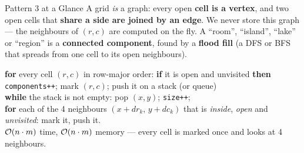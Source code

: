 \begin{patternbox}{Pattern 3 at a Glance}
A grid \emph{is} a graph: every open \textbf{cell is a vertex}, and two open cells that \textbf{share a side are joined by an edge}. We never store this graph --- the neighbours of $(r,c)$ are computed on the fly. A ``room'', ``island'', ``lake'' or ``region'' is a \textbf{connected component}, found by a \textbf{flood fill} (a DFS or BFS that spreads from one cell to its open neighbours).

\begin{center}
\end{center}

\begin{recurrencebox}
\small
\textbf{for} every cell $(r,c)$ in row-major order: \textbf{if} it is open and unvisited \textbf{then}\\
\hspace*{1.5em}\texttt{components++}; mark $(r,c)$; push it on a stack (or queue)\\
\hspace*{1.5em}\textbf{while} the stack is not empty: pop $(x,y)$; \texttt{size++};\\
\hspace*{3em}\textbf{for} each of the 4 neighbours $(x{+}dr_k,\,y{+}dc_k)$ that is \emph{inside}, \emph{open} and \emph{unvisited}: mark it, push it.\\[2pt]
\hspace*{\fill}$\mathcal{O}(n\cdot m)$ time, $\mathcal{O}(n\cdot m)$ memory --- every cell is marked once and looks at 4 neighbours.
\end{recurrencebox}
\end{patternbox}

